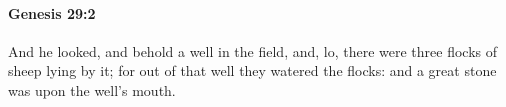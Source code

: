 
		\paragraph{Genesis 29:2} %
			\label{GENESIS-29-2}

			And he looked, and behold a well in the field, and, lo, there were three flocks of sheep lying by it; for out of that well they watered the flocks: and a great stone was upon the well's mouth.



